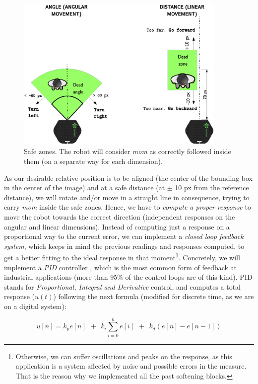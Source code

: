 		\begin{figure}[h]
			\centering
			\includegraphics[width=4in]{images/followperson_movement_schema}
			\caption{Safe zones. The robot will consider \emph{mom} as correctly followed inside them (on a separate way for each dimension).}
			\label{fig:6_followperson_safe_zones}
		\end{figure}
	
			As our desirable relative position is to be aligned (the center of the bounding box in the center of the image) and at a safe distance (at $\pm$ 10 px from the reference distance), we will rotate and/or move in a straight line in consequence, trying to carry \emph{mom} inside the safe zones. Hence, we have to \emph{compute a proper response} to move the robot towards the correct direction (independent responses on the angular and linear dimensions). Instead of computing just a response on a proportional way to the current error, we can implement a \emph{closed loop feedback system}, which keeps in mind the previous readings and responses computed, to get a better fitting to the ideal response in that moment\footnote{Otherwise, we can suffer oscillations and peaks on the response, as this application is a system affected by noise and possible errors in the measure. That is the reason why we implemented all the past softening blocks.}. Concretely, we will implement a \emph{PID} controller \cite{pid:}, which is the most common form of feedback at industrial applications (more than 95\% of the control loops are of this kind). PID stands for \emph{Proportional, Integral and Derivative} control, and computes a total response ($u(t)$) following the next formula (modified for discrete time, as we are on a digital system):
			
			\begin{equation}
			u[n] = k_p e[n] \ \ + \ \ k_i \sum_{i=0}^{n}e[i] \ \ + \ \ k_d (e[n] - e[n-1])
			\label{eq:6_pid}
			\end{equation}
			
